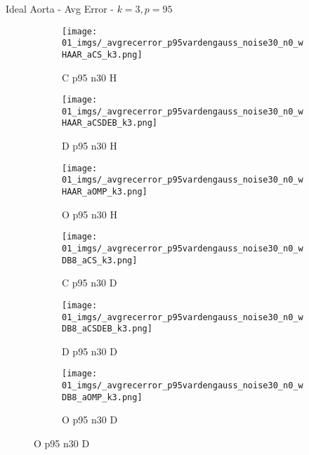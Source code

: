 \begin{frame}{Ideal Aorta - Avg Error - $k=3,p=95$}{}
\begin{figure}
\begin{subfigure}{0.13\textwidth}
\texttt{[image: 01\_imgs/\_avgrecerror\_p95vardengauss\_noise30\_n0\_wHAAR\_aCS\_k3.png]}
\caption*{\tiny C p95 n30 H}
\end{subfigure}
\begin{subfigure}{0.13\textwidth}
\texttt{[image: 01\_imgs/\_avgrecerror\_p95vardengauss\_noise30\_n0\_wHAAR\_aCSDEB\_k3.png]}
\caption*{\tiny D p95 n30 H}
\end{subfigure}
\begin{subfigure}{0.13\textwidth}
\texttt{[image: 01\_imgs/\_avgrecerror\_p95vardengauss\_noise30\_n0\_wHAAR\_aOMP\_k3.png]}
\caption*{\tiny O p95 n30 H}
\end{subfigure}
\begin{subfigure}{0.13\textwidth}
\texttt{[image: 01\_imgs/\_avgrecerror\_p95vardengauss\_noise30\_n0\_wDB8\_aCS\_k3.png]}
\caption*{\tiny C p95 n30 D}
\end{subfigure}
\begin{subfigure}{0.13\textwidth}
\texttt{[image: 01\_imgs/\_avgrecerror\_p95vardengauss\_noise30\_n0\_wDB8\_aCSDEB\_k3.png]}
\caption*{\tiny D p95 n30 D}
\end{subfigure}
\begin{subfigure}{0.13\textwidth}
\texttt{[image: 01\_imgs/\_avgrecerror\_p95vardengauss\_noise30\_n0\_wDB8\_aOMP\_k3.png]}
\caption*{\tiny O p95 n30 D}
\end{subfigure}
\end{figure}
\end{frame}


